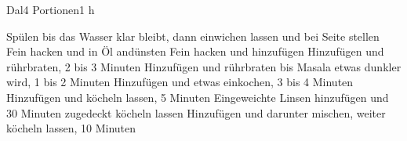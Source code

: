 \begin{recipe}{Dal}{4 Portionen}{1 h}

Spülen bis das Wasser klar bleibt, dann einwichen lassen und bei Seite stellen
Fein hacken und in Öl andünsten
Fein hacken und hinzufügen
Hinzufügen und rührbraten, 2 bis 3 Minuten
Hinzufügen und rührbraten bis Masala etwas dunkler wird, 1 bis 2 Minuten
Hinzufügen und etwas einkochen, 3 bis 4 Minuten
Hinzufügen und köcheln lassen, 5 Minuten
\ingredient[]{}{}
Eingeweichte Linsen hinzufügen und 30 Minuten zugedeckt köcheln lassen
Hinzufügen und darunter mischen, weiter köcheln lassen, 10 Minuten 

\end{recipe}
